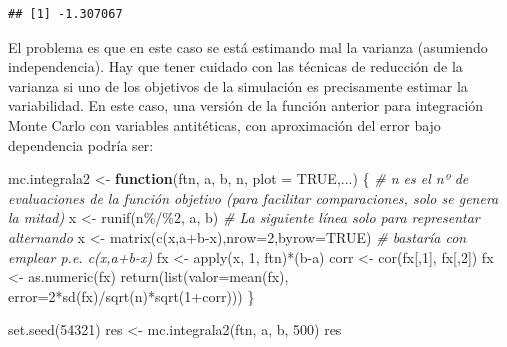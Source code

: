 \documentclass[
]{book}
\newenvironment{Shaded}{\begin{snugshade}}{\end{snugshade}}
\newcommand{\AttributeTok}[1]{\textcolor[rgb]{0.77,0.63,0.00}{#1}}
\newcommand{\CommentTok}[1]{\textcolor[rgb]{0.56,0.35,0.01}{\textit{#1}}}
\newcommand{\ConstantTok}[1]{\textcolor[rgb]{0.00,0.00,0.00}{#1}}
\newcommand{\ControlFlowTok}[1]{\textcolor[rgb]{0.13,0.29,0.53}{\textbf{#1}}}
\newcommand{\DecValTok}[1]{\textcolor[rgb]{0.00,0.00,0.81}{#1}}
\newcommand{\FunctionTok}[1]{\textcolor[rgb]{0.00,0.00,0.00}{#1}}
\newcommand{\NormalTok}[1]{#1}
\newcommand{\OtherTok}[1]{\textcolor[rgb]{0.56,0.35,0.01}{#1}}
\newcommand{\SpecialCharTok}[1]{\textcolor[rgb]{0.00,0.00,0.00}{#1}}
\theoremstyle{break}
\theoremstyle{definition}
\theoremstyle{definition}
\theoremstyle{definition}
\theoremstyle{definition}
\theoremstyle{remark}
\begin{document}
\begin{verbatim}
## [1] -1.307067
\end{verbatim}

El problema es que en este caso se está estimando mal la varianza (asumiendo independencia).
Hay que tener cuidado con las técnicas de reducción de la varianza si uno de los objetivos de la simulación es precisamente estimar la variabilidad.
En este caso, una versión de la función anterior para integración Monte Carlo con variables antitéticas, con aproximación del error bajo dependencia podría ser:

\begin{Shaded}
\begin{Highlighting}[]
\NormalTok{mc.integrala2 }\OtherTok{\textless{}{-}} \ControlFlowTok{function}\NormalTok{(ftn, a, b, n, }\AttributeTok{plot =} \ConstantTok{TRUE}\NormalTok{,...) \{}
  \CommentTok{\# n es el nº de evaluaciones de la función objetivo (para facilitar comparaciones, solo se genera la mitad)}
\NormalTok{  x }\OtherTok{\textless{}{-}} \FunctionTok{runif}\NormalTok{(n}\SpecialCharTok{\%/\%}\DecValTok{2}\NormalTok{, a, b)}
  \CommentTok{\# La siguiente línea solo para representar alternando}
\NormalTok{  x }\OtherTok{\textless{}{-}} \FunctionTok{matrix}\NormalTok{(}\FunctionTok{c}\NormalTok{(x,a}\SpecialCharTok{+}\NormalTok{b}\SpecialCharTok{{-}}\NormalTok{x),}\AttributeTok{nrow=}\DecValTok{2}\NormalTok{,}\AttributeTok{byrow=}\ConstantTok{TRUE}\NormalTok{)}
  \CommentTok{\# bastaría con emplear p.e. c(x,a+b{-}x)}
\NormalTok{  fx }\OtherTok{\textless{}{-}} \FunctionTok{apply}\NormalTok{(x, }\DecValTok{1}\NormalTok{,  ftn)}\SpecialCharTok{*}\NormalTok{(b}\SpecialCharTok{{-}}\NormalTok{a)}
\NormalTok{  corr }\OtherTok{\textless{}{-}} \FunctionTok{cor}\NormalTok{(fx[,}\DecValTok{1}\NormalTok{], fx[,}\DecValTok{2}\NormalTok{])}
\NormalTok{  fx }\OtherTok{\textless{}{-}} \FunctionTok{as.numeric}\NormalTok{(fx)}
  \FunctionTok{return}\NormalTok{(}\FunctionTok{list}\NormalTok{(}\AttributeTok{valor=}\FunctionTok{mean}\NormalTok{(fx), }\AttributeTok{error=}\DecValTok{2}\SpecialCharTok{*}\FunctionTok{sd}\NormalTok{(fx)}\SpecialCharTok{/}\FunctionTok{sqrt}\NormalTok{(n)}\SpecialCharTok{*}\FunctionTok{sqrt}\NormalTok{(}\DecValTok{1}\SpecialCharTok{+}\NormalTok{corr)))}
\NormalTok{\}}

\FunctionTok{set.seed}\NormalTok{(}\DecValTok{54321}\NormalTok{)}
\NormalTok{res }\OtherTok{\textless{}{-}} \FunctionTok{mc.integrala2}\NormalTok{(ftn, a, b, }\DecValTok{500}\NormalTok{)}
\NormalTok{res}
\end{Highlighting}
\end{Shaded}
\end{document}
